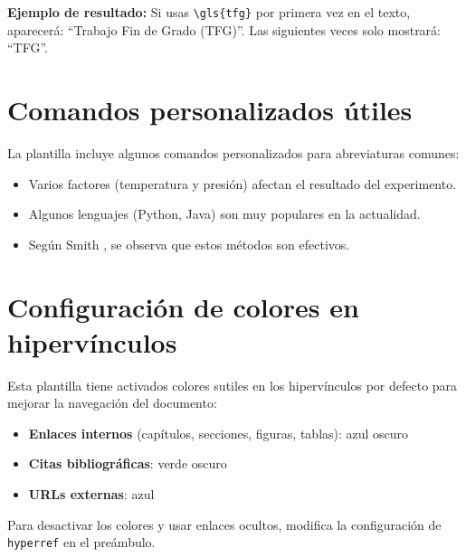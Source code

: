 \textbf{Ejemplo de resultado:}
Si usas \texttt{\textbackslash gls\{tfg\}} por primera vez en el texto, aparecerá: ``Trabajo Fin de Grado (TFG)''. Las siguientes veces solo mostrará: ``TFG''.

\section{Comandos personalizados útiles}
La plantilla incluye algunos comandos personalizados para abreviaturas comunes:
\begin{itemize}
  \item Varios factores (\ie temperatura y presión) afectan el resultado del experimento.
  \item Algunos lenguajes (\eg Python, Java) son muy populares en la actualidad.
  \item Según Smith \etal [1], se observa que estos métodos son efectivos.
\end{itemize}

\section{Configuración de colores en hipervínculos}
Esta plantilla tiene activados colores sutiles en los hipervínculos por defecto para mejorar la navegación del documento:
\begin{itemize}
  \item \textbf{Enlaces internos} (capítulos, secciones, figuras, tablas): azul oscuro
  \item \textbf{Citas bibliográficas}: verde oscuro
  \item \textbf{URLs externas}: azul
\end{itemize}
Para desactivar los colores y usar enlaces ocultos, modifica la configuración de \texttt{hyperref} en el preámbulo.
